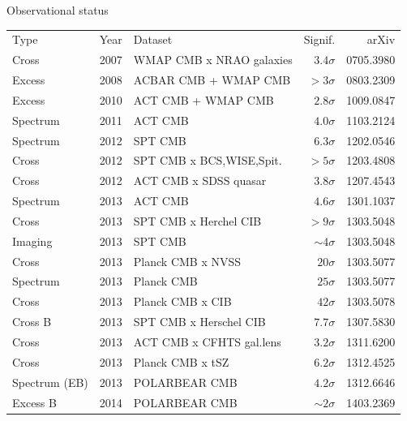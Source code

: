 \documentclass[table]{beamer}
\begin{document}
\begin{frame}{Observational status}
	\small
	\begin{tabular}{lrlrr}
		Type & Year & Dataset & Signif. &arXiv \\
		\rowcolor{red!25}   Cross     & 2007 &WMAP CMB x NRAO galaxies& $3.4\sigma$ &0705.3980  \\
		\rowcolor{green!25} Excess    & 2008 &ACBAR CMB + WMAP CMB    &  $>3\sigma$ &0803.2309  \\
		\rowcolor{green!25} Excess    & 2010 &ACT CMB + WMAP CMB      & $2.8\sigma$ &1009.0847  \\
		\rowcolor{blue!25}  Spectrum  & 2011 &ACT CMB                 & $4.0\sigma$ &1103.2124  \\
		\rowcolor{blue!25}  Spectrum  & 2012 &SPT CMB                 & $6.3\sigma$ &1202.0546  \\
		\rowcolor{red!25}   Cross     & 2012 &SPT CMB x BCS,WISE,Spit.&  $>5\sigma$ &1203.4808  \\
		\rowcolor{red!25}   Cross     & 2012 &ACT CMB x SDSS quasar   & $3.8\sigma$ &1207.4543  \\
		\rowcolor{blue!25}  Spectrum  & 2013 &ACT CMB                 & $4.6\sigma$ &1301.1037  \\
		\rowcolor{red!25}   Cross     & 2013 &SPT CMB x Herchel CIB   &  $>9\sigma$ &1303.5048  \\
		\rowcolor{yellow!25}Imaging   & 2013 &SPT CMB                &$\sim4\sigma$ &1303.5048  \\
		\rowcolor{red!25}   Cross     & 2013 &Planck CMB x NVSS       &  $20\sigma$ &1303.5077  \\
		\rowcolor{blue!25}  Spectrum  & 2013 &Planck CMB              &  $25\sigma$ &1303.5077  \\
		\rowcolor{red!25}   Cross     & 2013 &Planck CMB x CIB        &  $42\sigma$ &1303.5078  \\
		\rowcolor{orange!25}Cross B   & 2013 &SPT CMB x Herschel CIB  & $7.7\sigma$ &1307.5830  \\
		\rowcolor{red!25}   Cross     & 2013 &ACT CMB x CFHTS gal.lens& $3.2\sigma$ &1311.6200  \\
		\rowcolor{red!25}   Cross     & 2013 &Planck CMB x tSZ        & $6.2\sigma$ &1312.4525  \\
		\rowcolor{blue!25}  Spectrum (EB) & 2013 &POLARBEAR CMB           & $4.2\sigma$ &1312.6646  \\
		\rowcolor{green!25}  Excess B  & 2014 &POLARBEAR CMB          &$\sim2\sigma$ &1403.2369
	\end{tabular}
\end{frame}
\end{document}
